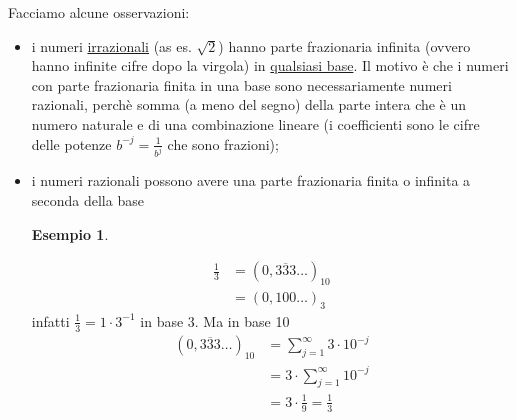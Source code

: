 \documentclass[12pt]{article}
\newtheorem*{esempio}{Esempio}
\begin{document}
Facciamo alcune osservazioni:
\begin{itemize}
    \item i numeri \uline{irrazionali} (as es. $\sqrt{2}$) hanno parte frazionaria infinita (ovvero hanno infinite cifre dopo la virgola) in \uline{qualsiasi base}. Il motivo è che i numeri con parte frazionaria finita in una base sono necessariamente numeri razionali, perchè somma (a meno del segno) della parte intera che è un numero naturale e di una combinazione lineare (i coefficienti sono le cifre delle potenze $b^{-j} = \frac{1}{b^j}$ che sono frazioni);
    \item i numeri razionali possono avere una parte frazionaria finita o infinita a seconda della base
    \begin{esempio} \end{esempio}
    \[ \begin{split}
        \frac{1}{3} & = (0,\overline{333} \dotsc)_{10} \\
        & = (0,100 \dotsc)_{3}
    \end{split} \]
    infatti $\frac{1}{3} = 1 \cdot 3^{-1}$ in base 3. Ma in base 10
    \[ \begin{split}
        (0,\overline{333} \dotsc)_{10} & = \sum_{j=1}^{\infty} 3 \cdot 10^{-j} \\
        & = 3 \cdot \sum_{j=1}^{\infty} 10^{-j} \\
        & = 3 \cdot \frac{1}{9} = \frac{1}{3} \\
        \end{split} 
        \]
\end{itemize}
\end{document}
